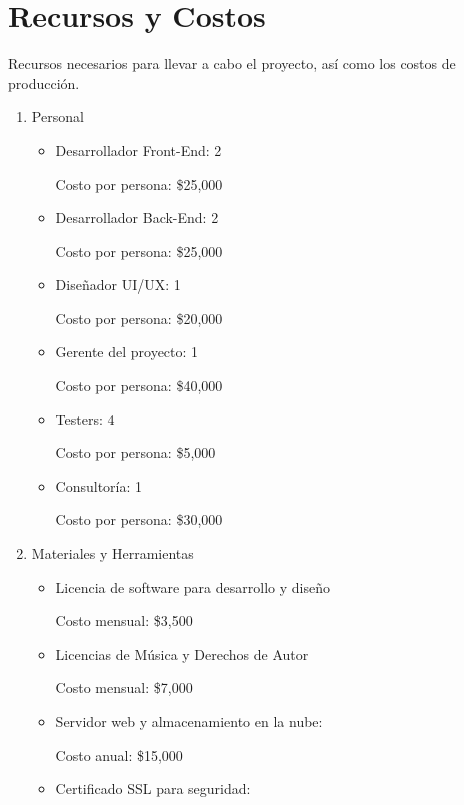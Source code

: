 \documentclass[12pt]{article}
\begin{document}
 \section*{Recursos y Costos}

Recursos necesarios para llevar a cabo el proyecto, así como los costos de producción.

\begin{enumerate}
	\item Personal

	\begin{itemize}
		\item Desarrollador Front-End: 2 

		Costo por persona: \$25,000

		\item Desarrollador Back-End: 2 

		Costo por persona: \$25,000

		\item Diseñador UI/UX: 1 

		Costo por persona: \$20,000

		\item Gerente del proyecto: 1

		Costo por persona: \$40,000

		\item Testers: 4

		Costo por persona: \$5,000

		\item Consultoría: 1

		Costo por persona: \$30,000

	\end{itemize}

	\item Materiales y Herramientas

	\begin{itemize}
		\item Licencia de software para desarrollo y diseño

		Costo mensual: \$3,500

		\item Licencias de Música y Derechos de Autor

		Costo mensual: \$7,000

		\item Servidor web y almacenamiento en la nube:

		Costo anual: \$15,000

		\item Certificado SSL para seguridad:


\end{itemize}
\end{enumerate}
\end{document}
